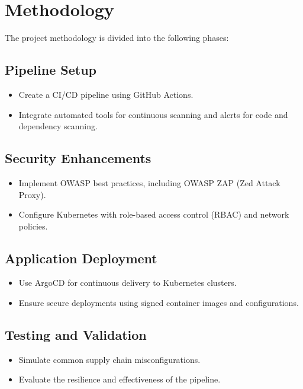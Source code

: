 \documentclass[conference]{IEEEtran}
\begin{document}
\section{Methodology}
The project methodology is divided into the following phases:

\subsection{Pipeline Setup}
\begin{itemize}
    \item Create a CI/CD pipeline using GitHub Actions.
    \item Integrate automated tools for continuous scanning and alerts for code and dependency scanning.
\end{itemize}

\subsection{Security Enhancements}
\begin{itemize}
    \item Implement OWASP best practices, including OWASP ZAP (Zed Attack Proxy).
    \item Configure Kubernetes with role-based access control (RBAC) and network policies.
\end{itemize}

\subsection{Application Deployment}
\begin{itemize}
    \item Use ArgoCD for continuous delivery to Kubernetes clusters.
    \item Ensure secure deployments using signed container images and configurations.
\end{itemize}

\subsection{Testing and Validation}
\begin{itemize}
    \item Simulate common supply chain misconfigurations.
    \item Evaluate the resilience and effectiveness of the pipeline.
\end{itemize}
\end{document}
